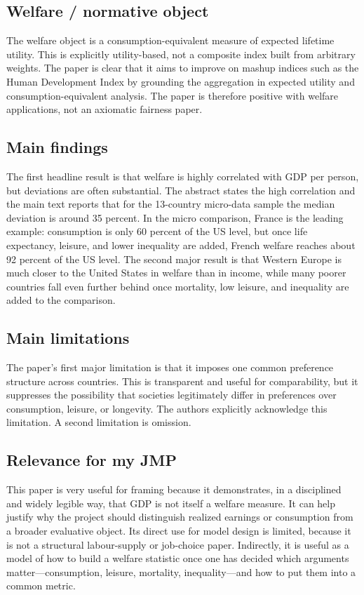 \documentclass[11pt,a4paper]{article}
\begin{document}
\subsection*{Welfare / normative object}
The welfare object is a consumption-equivalent measure of expected lifetime utility. This is explicitly utility-based, not a composite index built from arbitrary weights. The paper is clear that it aims to improve on mashup indices such as the Human Development Index by grounding the aggregation in expected utility and consumption-equivalent analysis. The paper is therefore positive with welfare applications, not an axiomatic fairness paper.

\subsection*{Main findings}
The first headline result is that welfare is highly correlated with GDP per person, but deviations are often substantial. The abstract states the high correlation and the main text reports that for the 13-country micro-data sample the median deviation is around 35 percent. In the micro comparison, France is the leading example: consumption is only 60 percent of the US level, but once life expectancy, leisure, and lower inequality are added, French welfare reaches about 92 percent of the US level. The second major result is that Western Europe is much closer to the United States in welfare than in income, while many poorer countries fall even further behind once mortality, low leisure, and inequality are added to the comparison.

\subsection*{Main limitations}
The paper’s first major limitation is that it imposes one common preference structure across countries. This is transparent and useful for comparability, but it suppresses the possibility that societies legitimately differ in preferences over consumption, leisure, or longevity. The authors explicitly acknowledge this limitation. A second limitation is omission.

\subsection*{Relevance for my JMP}
This paper is very useful for framing because it demonstrates, in a disciplined and widely legible way, that GDP is not itself a welfare measure. It can help justify why the project should distinguish realized earnings or consumption from a broader evaluative object. Its direct use for model design is limited, because it is not a structural labour-supply or job-choice paper. Indirectly, it is useful as a model of how to build a welfare statistic once one has decided which arguments matter—consumption, leisure, mortality, inequality—and how to put them into a common metric.
\end{document}
